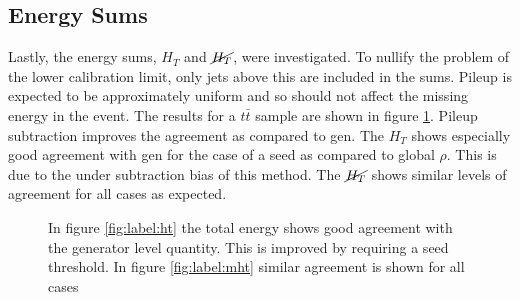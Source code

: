 \subsection{Energy Sums}
Lastly, the energy sums, $H_T$ and $\cancel{H_T}$, were investigated. To nullify the problem of the lower calibration limit, only jets above this are included in the sums. Pileup is expected to be approximately uniform and so should not affect the missing energy in the event. The results for a $t\bar{t}$ sample are shown in figure \ref{fig:label:sums}. Pileup subtraction improves the agreement as compared to gen.  The $H_T$ shows especially good agreement with gen for the case of a seed as compared to global $\rho$. This is due to the under subtraction bias of this method. The $\cancel{H_T}$ shows similar levels of agreement for all cases as expected. 
\begin{figure}
\hfill
{}
\hfill
{}
\caption{In figure \ref{fig:label:ht} the total energy shows good agreement with the generator level quantity. This is improved by requiring a seed threshold. In figure \ref{fig:label:mht} similar agreement is shown for all cases}
\label{fig:label:sums}
\end{figure}
